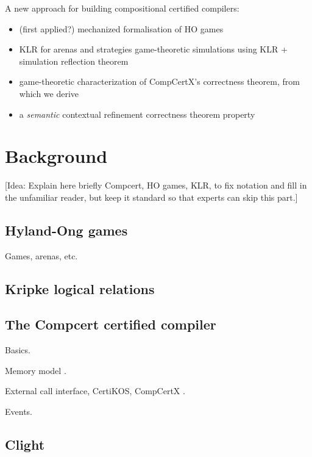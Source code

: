\documentclass[acmsmall,anonymous,review]{acmart}
\begin{document}
A new approach for building compositional certified compilers:
\begin{itemize}
\item (first applied?) mechanized formalisation of HO games
\item KLR for arenas and strategies game-theoretic simulations using KLR + simulation reflection theorem
\item game-theoretic characterization of CompCertX's correctness theorem, from which we derive
\item a \emph{semantic} contextual refinement correctness theorem property
\end{itemize}


\section{Background} %

[Idea:
Explain here briefly Compcert, HO games, KLR,
to fix notation and fill in the unfamiliar reader,
but keep it standard
so that experts can skip this part.]

\subsection{Hyland-Ong games} %

Games, arenas, etc.


\subsection{Kripke logical relations} %


\subsection{The Compcert certified compiler} %

Basics.

Memory model \citep{compcertmmv2}.

External call interface, CertiKOS, CompCertX \citep{popl15}.

Events.


\subsection{Clight} %
\end{document}
